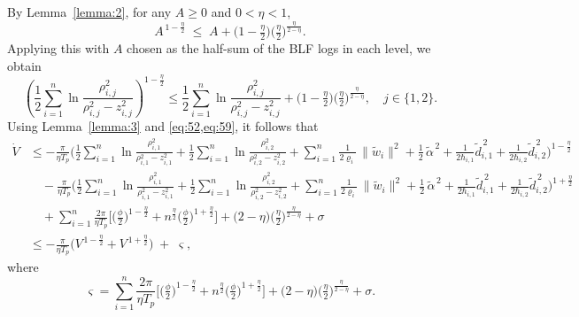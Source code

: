 \documentclass[pdflatex,sn-mathphys-num]{sn-jnl}%
\theoremstyle{thmstyleone}%
\theoremstyle{thmstyletwo}%
\theoremstyle{thmstylethree}%
\begin{document}
By Lemma~\ref{lemma:2}, for any \(A\ge 0\) and \(0<\eta<1\),
\[
  A^{\,1-\frac{\eta}{2}}
  \;\le\; A + \Big(1-\tfrac{\eta}{2}\Big)\Big(\tfrac{\eta}{2}\Big)^{\frac{\eta}{2-\eta}} .
\]
Applying this with \(A\) chosen as the half-sum of the BLF logs in each level, we obtain
\begin{equation}\label{eq:59}
  \left(\frac{1}{2}\sum_{i=1}^{n} \ln\frac{\rho_{i,j}^2}{\rho_{i,j}^2-z_{i,j}^2}\right)^{1-\frac{\eta}{2}}
  \le \frac{1}{2}\sum_{i=1}^{n} \ln\frac{\rho_{i,j}^2}{\rho_{i,j}^2-z_{i,j}^2}
     +\Big(1-\tfrac{\eta}{2}\Big)\Big(\tfrac{\eta}{2}\Big)^{\frac{\eta}{2-\eta}}\!,
  \quad j\in\{1,2\}.
\end{equation}
Using Lemma~\ref{lemma:3} and \cref{eq:52,eq:59}, it follows that
\begin{equation}\label{eq:60}
\begin{aligned}
  \dot V
  &\le -\frac{\pi}{\eta T_p}\Bigg(
       \frac{1}{2}\sum_{i=1}^{n} \ln\frac{\rho_{i,1}^2}{\rho_{i,1}^2-z_{i,1}^2}
     + \frac{1}{2}\sum_{i=1}^{n} \ln\frac{\rho_{i,2}^2}{\rho_{i,2}^2-z_{i,2}^2}
     + \sum_{i=1}^{n}\frac{1}{2\varrho_i}\,\|\tilde w_i\|^2
     + \frac{1}{2}\,\tilde\alpha^{\,2}
     + \frac{1}{2\hbar_{i,1}}\tilde d_{i,1}^{\,2}
     + \frac{1}{2\hbar_{i,2}}\tilde d_{i,2}^{\,2}
     \Bigg)^{1-\frac{\eta}{2}} \\[0.5mm]
  &\quad -\frac{\pi}{\eta T_p}\Bigg(
       \frac{1}{2}\sum_{i=1}^{n} \ln\frac{\rho_{i,1}^2}{\rho_{i,1}^2-z_{i,1}^2}
     + \frac{1}{2}\sum_{i=1}^{n} \ln\frac{\rho_{i,2}^2}{\rho_{i,2}^2-z_{i,2}^2}
     + \sum_{i=1}^{n}\frac{1}{2\varrho_i}\,\|\tilde w_i\|^2
     + \frac{1}{2}\,\tilde\alpha^{\,2}
     + \frac{1}{2\hbar_{i,1}}\tilde d_{i,1}^{\,2}
     + \frac{1}{2\hbar_{i,2}}\tilde d_{i,2}^{\,2}
     \Bigg)^{1+\frac{\eta}{2}} \\[0.5mm]
  &\quad + \sum_{i=1}^{n}\frac{2\pi}{\eta T_{p}}
     \Big[ \big(\tfrac{\phi}{2}\big)^{1-\frac{\eta}{2}}
          + n^{\frac{\eta}{2}}\big(\tfrac{\phi}{2}\big)^{1+\frac{\eta}{2}} \Big]
     + \Big(2-\eta\Big)\Big(\tfrac{\eta}{2}\Big)^{\frac{\eta}{2-\eta}}
     + \sigma \\[1mm]
  &\le -\frac{\pi}{\eta T_p}\Big(V^{\,1-\frac{\eta}{2}} + V^{\,1+\frac{\eta}{2}}\Big)\;+\;\varsigma ,
\end{aligned}
\end{equation}
where
\begin{equation}\label{eq:61}
  \varsigma
  = \sum_{i=1}^{n}\frac{2\pi}{\eta T_{p}}
     \Big[ \big(\tfrac{\phi}{2}\big)^{1-\frac{\eta}{2}}
          + n^{\frac{\eta}{2}}\big(\tfrac{\phi}{2}\big)^{1+\frac{\eta}{2}} \Big]
    + \Big(2-\eta\Big)\Big(\tfrac{\eta}{2}\Big)^{\frac{\eta}{2-\eta}}
    + \sigma .
\end{equation}
\end{document}
